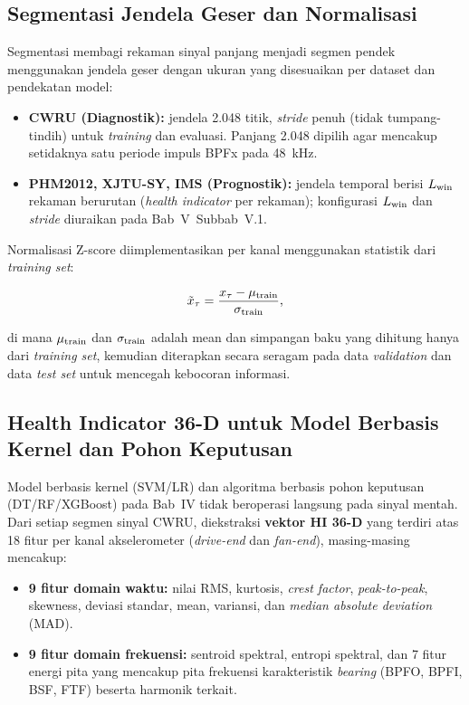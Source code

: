 \subsection{Segmentasi Jendela Geser dan Normalisasi}
\label{subsec:bab3_segmentasi}

Segmentasi membagi rekaman sinyal panjang menjadi segmen pendek menggunakan
jendela geser dengan ukuran yang disesuaikan per dataset dan pendekatan model:
\begin{itemize}
  \item \textbf{CWRU {\color{blue}(Diagnostik)}:} jendela 2.048 titik, \emph{stride} penuh
        (tidak tumpang-tindih) untuk \emph{training} dan evaluasi. Panjang
        2.048 dipilih agar mencakup setidaknya satu periode impuls BPFx
        pada 48~kHz.
  \item \textbf{PHM2012, XJTU-SY, IMS {\color{blue}(Prognostik)}:} jendela temporal berisi
        $L_{\rm win}$ rekaman berurutan (\emph{health indicator} per rekaman);
        konfigurasi $L_{\rm win}$ dan \emph{stride} diuraikan pada
        Bab~V~Subbab~V.1.
\end{itemize}

Normalisasi Z-score diimplementasikan per kanal menggunakan statistik dari
\emph{training set}:

\begin{equation}\label{eq:bab3_zscore}
  \tilde{x}_{\tau} = \frac{x_{\tau} - \mu_{\rm train}}{\sigma_{\rm train}},
\end{equation}

\noindent di mana $\mu_{\rm train}$ dan $\sigma_{\rm train}$ adalah mean dan
simpangan baku yang dihitung hanya dari \emph{training set}, kemudian
diterapkan secara seragam pada data \emph{validation} dan data \emph{test set} untuk
mencegah kebocoran informasi.

\subsection{Health Indicator 36-D untuk Model Berbasis Kernel dan Pohon Keputusan}
\label{subsec:bab3_hi36d}

Model berbasis kernel (SVM/LR) dan algoritma berbasis pohon keputusan
(DT/RF/XGBoost) pada Bab~IV tidak beroperasi langsung pada sinyal mentah.
Dari setiap segmen sinyal CWRU, diekstraksi \textbf{vektor HI 36-D} yang
terdiri atas 18 fitur per kanal akselerometer (\emph{drive-end} dan
\emph{fan-end}), masing-masing mencakup:

\begin{itemize}
  \item \textbf{9 fitur domain waktu:} nilai RMS, kurtosis,
        \emph{crest factor}, \emph{peak-to-peak}, skewness, deviasi
        standar, mean, variansi, dan \emph{median absolute deviation} (MAD).
  \item \textbf{9 fitur domain frekuensi:} sentroid spektral, entropi
        spektral, dan 7 fitur energi pita yang mencakup pita frekuensi
        karakteristik \emph{bearing} (BPFO, BPFI, BSF, FTF) beserta harmonik
        terkait.
\end{itemize}

